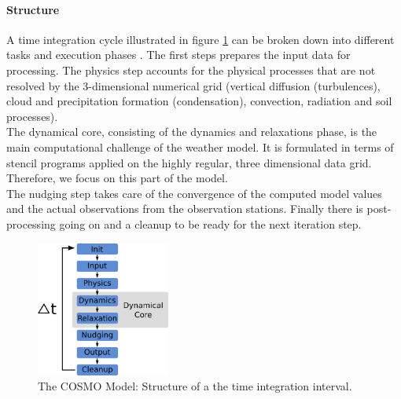\paragraph{Structure}
A time integration cycle illustrated in figure \ref{fig:cosmo-the-cosmo-model} can be broken down into different tasks and execution phases \cite{label49}. The first steps prepares the input data for processing. The physics step accounts for the physical processes that are not resolved by the 3-dimensional numerical grid (vertical diffusion (turbulences), cloud and precipitation formation (condensation), convection, radiation and soil processes). \\
The dynamical core, consisting of the dynamics and relaxations phase, is the main computational challenge of the weather model. It is formulated in terms of stencil programs applied on the highly regular, three dimensional data grid. Therefore, we focus on this part of the model. \\
The nudging step takes care of the convergence of the computed model values and the actual observations from the observation stations. Finally there is post-processing going on and a cleanup to be ready for the next iteration step.
\begin{figure}[h]
	\centering
	\includegraphics[height=12em]{drawings/cosmo-the-cosmo-model.png}
	\caption{The COSMO Model: Structure of a the time integration interval.}
	\label{fig:cosmo-the-cosmo-model}
\end{figure}


